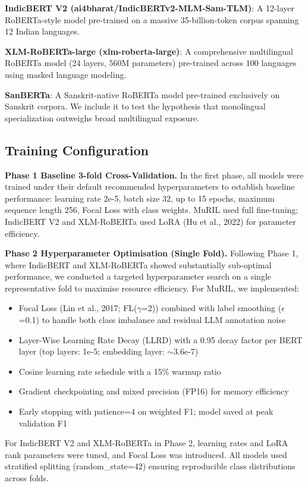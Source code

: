 \documentclass[11pt]{article}
\begin{document}
\textbf{IndicBERT V2 (ai4bharat/IndicBERTv2-MLM-Sam-TLM)}: A 12-layer RoBERTa-style model pre-trained on a massive 35-billion-token corpus spanning 12 Indian languages.

\textbf{XLM-RoBERTa-large (xlm-roberta-large)}: A comprehensive multilingual RoBERTa model (24 layers, 560M parameters) pre-trained across 100 languages using masked language modeling.

\textbf{SanBERTa}: A Sanskrit-native RoBERTa model pre-trained exclusively on Sanskrit corpora. We include it to test the hypothesis that monolingual specialization outweighs broad multilingual exposure.

\subsection{Training Configuration}

\textbf{Phase 1 Baseline 3-fold Cross-Validation.} In the first phase, all models were trained under their default recommended hyperparameters to establish baseline performance: learning rate 2e-5, batch size 32, up to 15 epochs, maximum sequence length 256, Focal Loss with class weights. MuRIL used full fine-tuning; IndicBERT V2 and XLM-RoBERTa used LoRA (Hu et al., 2022) for parameter efficiency.

\textbf{Phase 2 Hyperparameter Optimisation (Single Fold).} Following Phase 1, where IndicBERT and XLM-RoBERTa showed substantially sub-optimal performance, we conducted a targeted hyperparameter search on a single representative fold to maximise resource efficiency. For MuRIL, we implemented:
\begin{itemize}
    \item Focal Loss (Lin et al., 2017; FL($\gamma$=2)) combined with label smoothing ($\epsilon$=0.1) to handle both class imbalance and residual LLM annotation noise
    \item Layer-Wise Learning Rate Decay (LLRD) with a 0.95 decay factor per BERT layer (top layers: 1e-5; embedding layer: $\sim$3.6e-7)
    \item Cosine learning rate schedule with a 15\% warmup ratio
    \item Gradient checkpointing and mixed precision (FP16) for memory efficiency
    \item Early stopping with patience=4 on weighted F1; model saved at peak validation F1
\end{itemize}
For IndicBERT V2 and XLM-RoBERTa in Phase 2, learning rates and LoRA rank parameters were tuned, and Focal Loss was introduced. All models used stratified splitting (random\_state=42) ensuring reproducible class distributions across folds.
\end{document}
